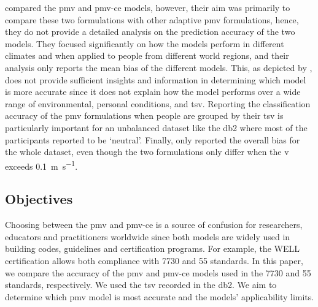  compared the \ac{pmv} and \ac{pmv-ce} models, however, their aim was primarily to compare these two formulations with other adaptive \ac{pmv} formulations, hence, they do not provide a detailed analysis on the prediction accuracy of the two models.
They focused significantly on how the models perform in different climates and when applied to people from different world regions, and their analysis only reports the mean bias of the different models.
This, as depicted by , does not provide sufficient insights and information in determining which model is more accurate since it does not explain how the model performs over a wide range of environmental, personal conditions, and \ac{tsv}.
Reporting the classification accuracy of the \ac{pmv} formulations when people are grouped by their \ac{tsv} is particularly important for an unbalanced dataset like the \ac{db2} where most of the participants reported to be `neutral'.
Finally,  only reported the overall bias for the whole dataset, even though the two formulations only differ when the \ac{v} exceeds \qty{0.1}{\m\per\s}.

\subsection{Objectives}\label{subsec:aim-and-objectives}
Choosing between the \ac{pmv} and \ac{pmv-ce} is a source of confusion for researchers, educators and practitioners worldwide since both models are widely used in building codes, guidelines and certification programs.
For example, the WELL certification allows both compliance with \gls{7730} and \gls{55} standards.
In this paper, we compare the accuracy of the \ac{pmv} and \ac{pmv-ce} models used in the \gls{7730} and \gls{55} standards, respectively.
We used the \ac{tsv} recorded in the \acf{db2}.
We aim to determine which \ac{pmv} model is most accurate and the models' applicability limits.